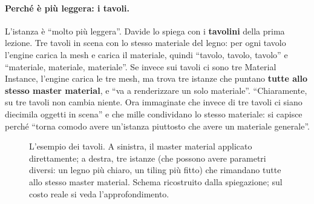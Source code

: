 \paragraph{Perché è più leggera: i tavoli.} L'istanza è ``molto più leggera''. Davide
lo spiega con i \textbf{tavolini} della prima lezione. Tre tavoli in scena con lo
stesso materiale del legno: per ogni tavolo l'engine carica la mesh e carica il
materiale, quindi ``tavolo, tavolo, tavolo'' e ``materiale, materiale, materiale''. Se
invece sui tavoli ci sono tre Material Instance, l'engine carica le tre mesh, ma trova
tre istanze che puntano \textbf{tutte allo stesso master material}, e ``va a
renderizzare un solo materiale''. ``Chiaramente, su tre tavoli non cambia niente. Ora
immaginate che invece di tre tavoli ci siano diecimila oggetti in scena'' e che mille
condividano lo stesso materiale: si capisce perché ``torna comodo avere un'istanza
piuttosto che avere un materiale generale''.

\begin{figure}[htbp]
\centering
{}
\caption{L'esempio dei tavoli. A sinistra, il master material applicato direttamente;
a destra, tre istanze (che possono avere parametri diversi: un legno più chiaro, un
tiling più fitto) che rimandano tutte allo stesso master material. Schema ricostruito
dalla spiegazione; sul costo reale si veda l'approfondimento.}
\label{ue3:fig:tavoli}
\end{figure}

